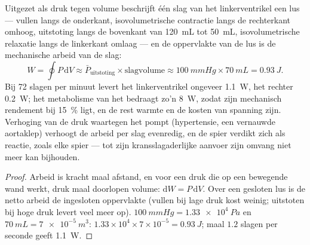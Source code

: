 \begin{theorem}\label{thm:b2:heart:work}
Uitgezet als druk tegen volume beschrijft één slag van het linkerventrikel
een lus --- vullen langs de onderkant, isovolumetrische contractie langs de
rechterkant omhoog, uitstoting langs de bovenkant van
\qty{120}{mL} tot \qty{50}{mL}, isovolumetrische relaxatie langs de
linkerkant omlaag --- en de oppervlakte van de lus is de mechanische arbeid
van de slag:
\[
W = \oint P\,\mathrm{d}V \approx \bar P_{\text{uitstoting}}\times \text{slagvolume} \approx \qty{100}{mmHg}\times\qty{70}{mL} = \qty{0.93}{J}.
\]
Bij 72 slagen per minuut levert het linkerventrikel ongeveer \qty{1.1}{W},
het rechter \qty{0.2}{W}; het metabolisme van het  bedraagt zo'n
\qty{8}{W}, zodat zijn mechanisch rendement bij \qty{15}{\%} ligt, en de rest
warmte en de kosten van spanning zijn. Verhoging van de druk waartegen het
 pompt (hypertensie, een vernauwde aortaklep) verhoogt de arbeid per
slag evenredig, en de spier verdikt zich als reactie, zoals elke spier ---
tot zijn kransslagaderlijke aanvoer zijn omvang niet meer kan bijhouden.
\end{theorem}
\begin{proof}
Arbeid is kracht maal afstand, en voor een druk die op een bewegende wand
werkt, druk maal doorlopen volume: $\mathrm{d}W = P\,\mathrm{d}V$.
Over een gesloten lus is de netto arbeid de ingesloten oppervlakte (vullen
bij lage druk kost weinig; uitstoten bij hoge druk levert veel meer op).
$\qty{100}{mmHg} = \qty{1.33e4}{Pa}$ en $\qty{70}{mL} =
\qty{7e-5}{m^3}$: $1.33\times 10^{4}\times 7\times 10^{-5} =
\qty{0.93}{J}$; maal $1.2$ slagen per seconde geeft \qty{1.1}{W}.
\end{proof}


